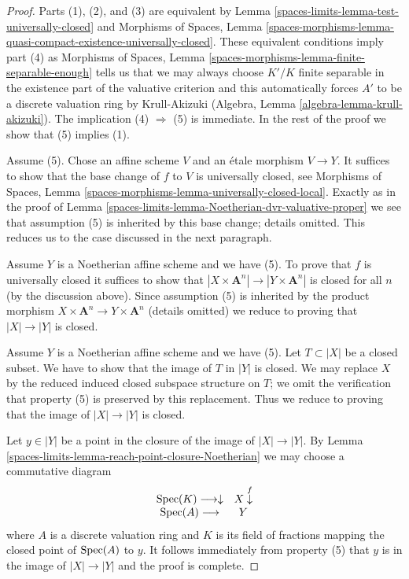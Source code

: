 \begin{proof}
Parts (1), (2), and (3) are equivalent by
Lemma \ref{spaces-limits-lemma-test-universally-closed} and
Morphisms of Spaces, Lemma
\ref{spaces-morphisms-lemma-quasi-compact-existence-universally-closed}.
These equivalent conditions imply part (4) as
Morphisms of Spaces, Lemma \ref{spaces-morphisms-lemma-finite-separable-enough}
tells us that we may always choose $K'/K$ finite separable in
the existence part of the valuative criterion and this
automatically forces $A'$ to be a discrete valuation ring by Krull-Akizuki
(Algebra, Lemma \ref{algebra-lemma-krull-akizuki}).
The implication (4) $\Rightarrow$ (5) is immediate.
In the rest of the proof we show that (5) implies (1).

\medskip\noindent
Assume (5). Chose an affine scheme $V$ and an \'etale morphism $V \to Y$.
It suffices to show that the base change of $f$ to $V$ is universally closed,
see Morphisms of Spaces, Lemma
\ref{spaces-morphisms-lemma-universally-closed-local}.
Exactly as in the proof of Lemma \ref{spaces-limits-lemma-Noetherian-dvr-valuative-proper}
we see that assumption (5) is inherited by this base change; details
omitted. This reduces us to the case discussed in the next paragraph.

\medskip\noindent
Assume $Y$ is a Noetherian affine scheme and we have (5).
To prove that $f$ is universally closed it suffices to show that
$|X \times \mathbf{A}^n| \to |Y \times \mathbf{A}^n|$ is closed
for all $n$ (by the discussion above). Since assumption (5)
is inherited by the product morphism
$X \times \mathbf{A}^n \to Y \times \mathbf{A}^n$ (details omitted)
we reduce to proving that $|X| \to |Y|$ is closed.

\medskip\noindent
Assume $Y$ is a Noetherian affine scheme and we have (5).
Let $T \subset |X|$ be a closed subset. We have to show that
the image of $T$ in $|Y|$ is closed. We may replace $X$
by the reduced induced closed subspace structure on $T$; we
omit the verification that property (5) is preserved by
this replacement. Thus we reduce to proving that the image
of $|X| \to |Y|$ is closed.

\medskip\noindent
Let $y \in |Y|$ be a point in the closure of the image of
$|X| \to |Y|$. By Lemma \ref{spaces-limits-lemma-reach-point-closure-Noetherian}
we may choose a commutative diagram
$$
\begin{array}{cc}\operatorname{Spec}(K) \longrightarrow\downarrow & X \overset{f}{\downarrow} \\ \operatorname{Spec}(A) \longrightarrow & Y\end{array}
$$
where $A$ is a discrete valuation ring and $K$ is its field of fractions
mapping the closed point of $\operatorname{Spec}(A)$ to $y$. It follows immediately
from property (5) that $y$ is in the image of
$|X| \to |Y|$ and the proof is complete.
\end{proof}

